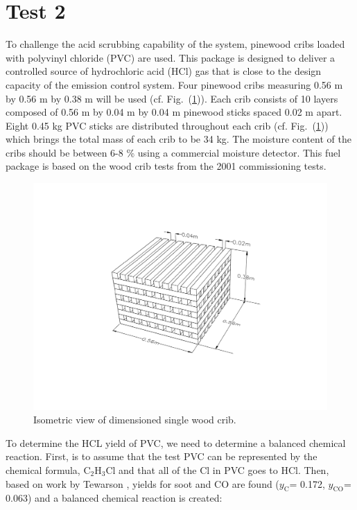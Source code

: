 \documentclass[12pt,oneside]{book}
\renewcommand{\C}{\mbox{C}}
\renewcommand{\H}{\mbox{H}}
\newcommand{\Cl}{\mbox{Cl}}
\begin{document}
\section{Test 2}
\label{test2}
To challenge the acid scrubbing capability of the system, pinewood cribs loaded with polyvinyl chloride (PVC) are used. This package is designed to deliver a controlled source of hydrochloric acid (HCl) gas that is close to the design capacity of the emission control system. Four pinewood cribs measuring 0.56 m by 0.56 m by 0.38 m will be used (cf. Fig.~(\ref{fig:wood_crib})). Each crib consists of 10 layers composed of 0.56 m by 0.04 m by 0.04 m pinewood sticks spaced 0.02 m apart. Eight 0.45 kg PVC sticks are distributed throughout each crib (cf. Fig.~(\ref{fig:wood_crib})) which brings the total mass of each crib to be 34 kg. The moisture content of the cribs should be between 6-8 \% using a commercial moisture detector. This fuel package is based on the wood crib tests from the 2001 commissioning tests.

\begin{figure}
\centering
\includegraphics[width=.75\textwidth]{../Figures/Wood_Cribs}
\caption {Isometric view of dimensioned single wood crib.}
\label{fig:wood_crib}
\end{figure}

To determine the HCL yield of PVC, we need to determine a balanced chemical reaction. First, is to assume that the test PVC can be represented by the chemical formula, $\C_2\H_3\Cl$ and that all of the Cl in PVC goes to HCl. Then, based on work by Tewarson \cite{SFPE:Tewarson}, yields for soot and CO are found ($y_{\mathrm{C}}$= 0.172, $y_{\mathrm{CO}}$= 0.063) and a balanced chemical reaction is created:
\end{document}
